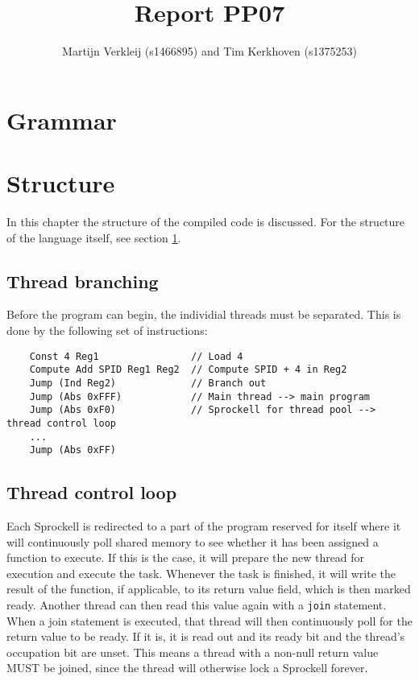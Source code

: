 \documentclass[10pt,a4paper]{report}
\author{Martijn Verkleij (s1466895) and Tim Kerkhoven (s1375253)}
\title{Report PP07}
\begin{document}
\maketitle
\tableofcontents

\chapter{Grammar} \label{Grammar}

\chapter{Structure} \label{Structure}
In this chapter the structure of the compiled code is discussed. For the structure of the language itself, see section \ref{Grammar}. 
\section{Thread branching}
Before the program can begin, the individial threads must be separated. This is done by the following set of instructions:
\begin{verbatim}
	Const 4 Reg1				// Load 4
	Compute Add SPID Reg1 Reg2	// Compute SPID + 4 in Reg2
	Jump (Ind Reg2)				// Branch out
	Jump (Abs 0xFFF)			// Main thread --> main program
	Jump (Abs 0xF0)				// Sprockell for thread pool --> thread control loop
	...
	Jump (Abs 0xFF)
\end{verbatim}

\section{Thread control loop}
Each Sprockell is redirected to a part of the program reserved for itself where it will continuously poll shared memory to see whether it has been assigned a function to execute. If this is the case, it will prepare the new thread for execution and execute the task. Whenever the task is finished, it will write the result of the function, if applicable, to its return value field, which is then marked ready. Another thread can then read this value again with a \texttt{join} statement. When a join statement is executed, that thread will then continuously poll for the return value to be ready. If it is, it is read out and its ready bit and the thread's occupation bit are unset. This means a thread with a non-null return value MUST be joined, since the thread will otherwise lock a Sprockell forever. 
\end{document}
